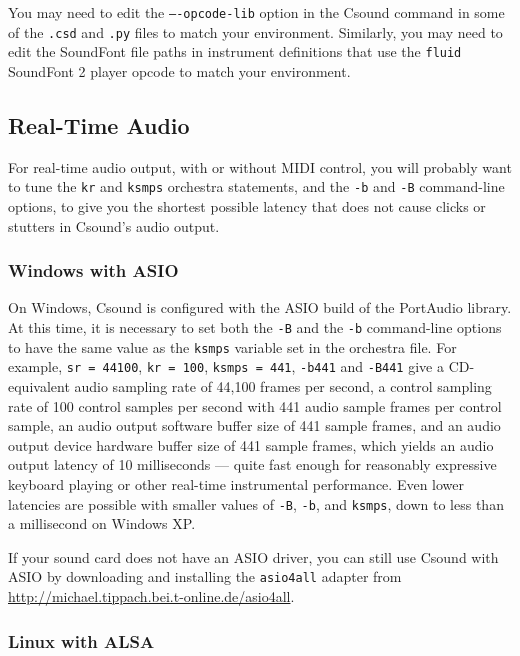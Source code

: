 \documentclass[10pt,letterpaper,onecolumn]{book}
\begin{document}
You may need to edit the \texttt{----opcode-lib} option in the Csound command in some of the  \texttt{.csd} and \texttt{.py} files to match your environment. Similarly, you may need to edit the SoundFont file paths in instrument definitions that use the \texttt{fluid} SoundFont 2 player opcode to match your environment.

\subsection{Real-Time Audio}

For real-time audio output, with or without MIDI control, you will probably want to tune the \texttt{kr} and \texttt{ksmps} orchestra statements, and the \texttt{-b} and \texttt{-B} command-line options, to give you the shortest possible latency that does not cause clicks or stutters in Csound's audio output. 

\subsubsection{Windows with ASIO}

On Windows, Csound is configured with the ASIO build of the PortAudio library. At this time, it is necessary to set both the \texttt{-B} and the \texttt{-b} command-line options to have the same value as the \texttt{ksmps} variable set in the orchestra file. For example, \texttt{sr = 44100}, \texttt{kr = 100}, \texttt{ksmps = 441}, \texttt{-b441} and \texttt{-B441} give a CD-equivalent audio sampling rate of 44,100 frames per second, a control sampling rate of 100 control samples per second with 441 audio sample frames per control sample, an audio output software buffer size of 441 sample frames, and an audio output device hardware buffer size of 441 sample frames, which yields an audio output latency of 10 milliseconds --- quite fast enough for reasonably expressive keyboard playing or other real-time instrumental performance. Even lower latencies are possible with smaller values of \texttt{-B}, \texttt{-b}, and \texttt{ksmps}, down to less than a millisecond on Windows XP.

If your sound card does not have an ASIO driver, you can still use Csound with ASIO by downloading and installing the \texttt{asio4all} adapter from \url{http://michael.tippach.bei.t-online.de/asio4all}.

\subsubsection{Linux with ALSA}
\end{document}
